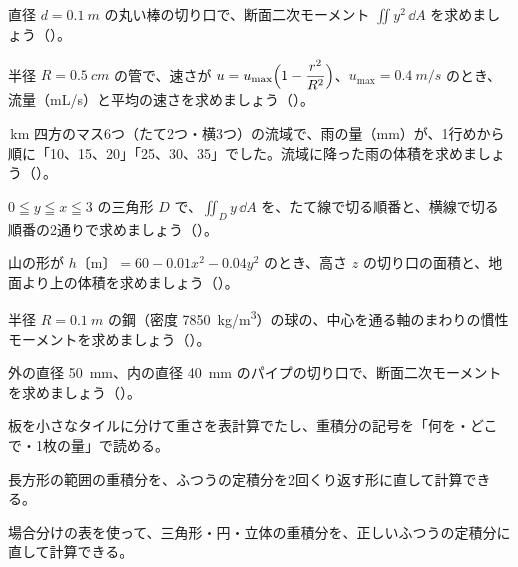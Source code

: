 \bkproblem 直径 $d=\qty{0.1}{m}$ の丸い棒の切り口で、断面二次モーメント $\iint y^2\,\dd A$ を求めましょう\mbox{（）}。

\bkproblem 半径 $R=\qty{0.5}{cm}$ の管で、速さが $u=u_{\max}\Bigl(1-\dfrac{r^2}{R^2}\Bigr)$、$u_{\max}=\qty{0.4}{m/s}$ のとき、流量（mL/s）と平均の速さを求めましょう\mbox{（）}。

\,km 四方のマス6つ（たて2つ・横3つ）の流域で、雨の量（mm）が、1行めから順に「10、15、20」「25、30、35」でした。流域に降った雨の体積を求めましょう\mbox{（）}。


\bkproblem $0\leqq y\leqq x\leqq3$ の三角形 $D$ で、$\iint_D y\,\dd A$ を、たて線で切る順番と、横線で切る順番の2通りで求めましょう\mbox{（）}。

\bkproblem 山の形が $h$〔m〕$=60-0.01x^2-0.04y^2$ のとき、高さ $z$ の切り口の面積と、地面より上の体積を求めましょう\mbox{（）}。

\bkproblem 半径 $R=\qty{0.1}{m}$ の鋼（密度 \qty{7850}{kg/m^3}）の球の、中心を通る軸のまわりの慣性モーメントを求めましょう\mbox{（）}。

\bkproblem 外の直径 \qty{50}{mm}、内の直径 \qty{40}{mm} のパイプの切り口で、断面二次モーメントを求めましょう\mbox{（）}。

\begin{furikaeri}
\begin{checklist}
\item 板を小さなタイルに分けて重さを表計算でたし、重積分の記号を「何を・どこで・1枚の量」で読める。
\item 長方形の範囲の重積分を、ふつうの定積分を2回くり返す形に直して計算できる。
\item 場合分けの表を使って、三角形・円・立体の重積分を、正しいふつうの定積分に直して計算できる。
\end{checklist}
\end{furikaeri}

